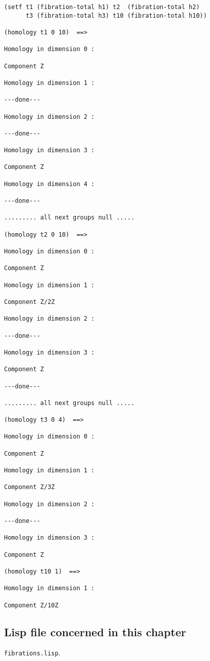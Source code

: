 {\footnotesize\begin{verbatim}
(setf t1 (fibration-total h1) t2  (fibration-total h2)
      t3 (fibration-total h3) t10 (fibration-total h10))

(homology t1 0 10)  ==>

Homology in dimension 0 :

Component Z

Homology in dimension 1 :

---done---

Homology in dimension 2 :

---done---

Homology in dimension 3 :

Component Z

Homology in dimension 4 :

---done---

......... all next groups null .....

(homology t2 0 10)  ==>

Homology in dimension 0 :

Component Z

Homology in dimension 1 :

Component Z/2Z

Homology in dimension 2 :

---done---

Homology in dimension 3 :

Component Z

---done---

......... all next groups null .....

(homology t3 0 4)  ==>

Homology in dimension 0 :

Component Z

Homology in dimension 1 :

Component Z/3Z

Homology in dimension 2 :

---done---

Homology in dimension 3 :

Component Z

(homology t10 1)  ==>

Homology in dimension 1 :

Component Z/10Z
\end{verbatim}}

\subsection* {Lisp file concerned in this chapter}

{\tt fibrations.lisp}.
